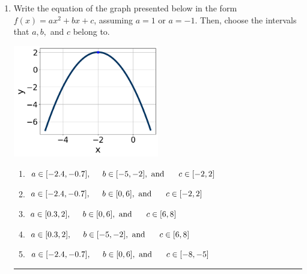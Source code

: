 \documentclass[14pt]{extbook}
\newcommand{\litem}[1]{\item#1\hspace*{-1cm}\rule{\textwidth}{0.4pt}}
\begin{document}
\begin{enumerate}
\litem{
Write the equation of the graph presented below in the form $f(x)=ax^2+bx+c$, assuming  $a=1$ or $a=-1$. Then, choose the intervals that $a, b,$ and $c$ belong to.
\begin{center}
    \includegraphics[width=0.5\textwidth]{../Figures/quadraticGraphToEquationCopyA.png}
\end{center}
\begin{enumerate}[label=\Alph*.]
\item \( a \in [-2.4, -0.7], \hspace*{5mm} b \in [-5, -2], \text{ and } \hspace*{5mm} c \in [-2, 2] \)
\item \( a \in [-2.4, -0.7], \hspace*{5mm} b \in [0, 6], \text{ and } \hspace*{5mm} c \in [-2, 2] \)
\item \( a \in [0.3, 2], \hspace*{5mm} b \in [0, 6], \text{ and } \hspace*{5mm} c \in [6, 8] \)
\item \( a \in [0.3, 2], \hspace*{5mm} b \in [-5, -2], \text{ and } \hspace*{5mm} c \in [6, 8] \)
\item \( a \in [-2.4, -0.7], \hspace*{5mm} b \in [0, 6], \text{ and } \hspace*{5mm} c \in [-8, -5] \)


\end{enumerate}}
\end{enumerate}
\end{document}
